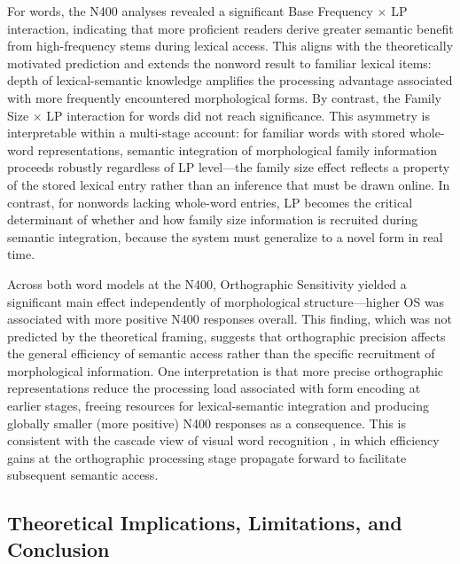 	For words, the N400 analyses revealed a significant Base Frequency $\times$ LP interaction, indicating that more proficient readers derive greater semantic benefit from high-frequency stems during lexical access. This aligns with the theoretically motivated prediction and extends the nonword result to familiar lexical items: depth of lexical-semantic knowledge amplifies the processing advantage associated with more frequently encountered morphological forms. By contrast, the Family Size $\times$ LP interaction for words did not reach significance. This asymmetry is interpretable within a multi-stage account: for familiar words with stored whole-word representations, semantic integration of morphological family information proceeds robustly regardless of LP level—the family size effect reflects a property of the stored lexical entry rather than an inference that must be drawn online. In contrast, for nonwords lacking whole-word entries, LP becomes the critical determinant of whether and how family size information is recruited during semantic integration, because the system must generalize to a novel form in real time.
	
	Across both word models at the N400, Orthographic Sensitivity yielded a significant main effect independently of morphological structure—higher OS was associated with more positive N400 responses overall. This finding, which was not predicted by the theoretical framing, suggests that orthographic precision affects the general efficiency of semantic access rather than the specific recruitment of morphological information. One interpretation is that more precise orthographic representations reduce the processing load associated with form encoding at earlier stages, freeing resources for lexical-semantic integration and producing globally smaller (more positive) N400 responses as a consequence. This is consistent with the cascade view of visual word recognition \citep{CITATION}, in which efficiency gains at the orthographic processing stage propagate forward to facilitate subsequent semantic access.
	
	\subsection{Theoretical Implications, Limitations, and Conclusion}
	
